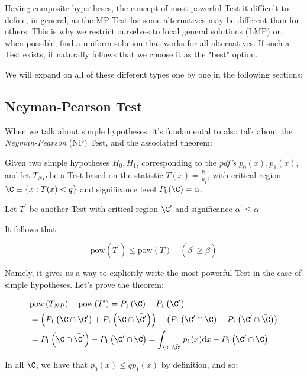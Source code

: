 Having composite hypotheses, the concept of most powerful Test it difficult to define, in general, as the MP Test for some alternatives may be different than for others. This is why we restrict ourselves to local general solutions (LMP) or, when possible, find a uniform solution that works for all alternatives. If such a Test exists, it naturally follows that we choose it as the "best" option.

We will expand on all of these different types one by one in the following sections:

\subsection{Neyman-Pearson Test}

When we talk about simple hypotheses, it's fundamental to also talk about the \emph{Neyman-Pearson} (NP) Test, and the associated theorem:

\begin{theorem}
	Given two simple hypotheses $H_0,H_1$, corresponding to the \emph{pdf's} $p_0(x),p_1(x)$, and let $T_{NP}$ be a Test based on the statistic $T(x) = \frac{p_0}{p_1}$, with critical region $\C\equiv \{x: T(x)<q\}$ and significance level $P_0(\C)=\alpha$.
	
	Let $T^\prime$ be another Test with critical region $\C^\prime$ and significance $\alpha^\prime\leq\alpha$ 
	
	It follows that 
	
	\[
	\text{pow}(T^\prime) \leq \text{pow}(T) \quad (\beta^\prime \geq \beta)
	\]
\end{theorem}

Namely, it gives us a way to explicitly write the most powerful Test in the case of simple hypotheses. Let's prove the theorem:

\begin{align*}
	&\text{pow}\left(T_{NP}\right) - \text{pow}\left(T^\prime\right) = P_1\left(\C\right) - P_1\left(\C^\prime\right)\\
	&= \left(P_1\left(\C\cap\C^\prime\right) + P_1\left(\C\cap\bar{\C^\prime}\right)\right) - \left(P_1\left(\C^\prime\cap\C\right) + P_1\left(\C^\prime\cap\bar{\C}\right)\right)\\
	&= P_1\left(\C\cap\bar{\C^\prime}\right) - P_1\left(\C^\prime\cap\bar{\C}\right) = \int_{\C\cap\bar{\C^\prime}} p_1(x)\dd x - P_1\left(\C^\prime\cap\bar{\C}\right)
\end{align*}

In all $\C$, we have that $p_0(x) \leq qp_1(x)$ by definition, and so:
	
